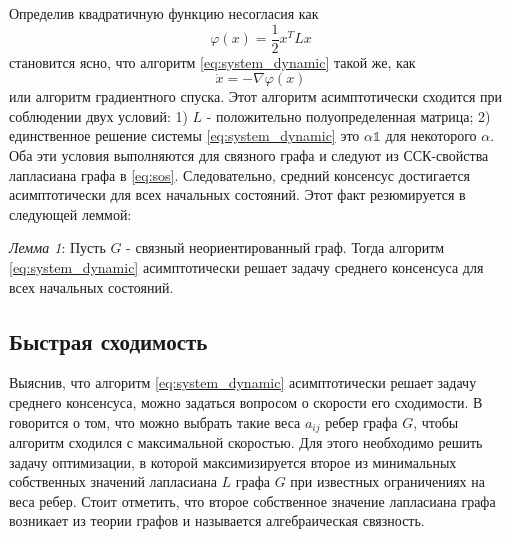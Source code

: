 \documentclass[a4paper,article,14pt]{extarticle}
\begin{document}
Определив квадратичную функцию несогласия как
\begin{equation}
\varphi(x) = \frac{1}{2}x^TLx
\end{equation}
становится ясно, что алгоритм \ref{eq:system_dynamic} такой же, как
\begin{equation}
\dot x = -\nabla \varphi(x)
\end{equation}
или алгоритм градиентного спуска. Этот алгоритм асимптотически сходится при соблюдении двух условий: 1) $L$ - положительно полуопределенная матрица; 2) единственное решение системы \ref{eq:system_dynamic} это $\alpha \mathds{1}$ для некоторого $\alpha$. Оба эти условия выполняются для связного графа и следуют из ССК-свойства лапласиана графа в \ref{eq:sos}. Следовательно, средний консенсус достигается асимптотически для всех начальных состояний. Этот факт резюмируется в \cite{consensus_basics} следующей леммой:

\textit{Лемма 1}: Пусть $G$ - связный неориентированный граф. Тогда алгоритм \ref{eq:system_dynamic} асимптотически решает задачу среднего консенсуса для всех начальных состояний.

\subsection{Быстрая сходимость}
Выяснив, что алгоритм \ref{eq:system_dynamic} асимптотически решает задачу среднего консенсуса, можно задаться вопросом о скорости его сходимости. В \cite{fast_averaging} говорится о том, что можно выбрать такие веса $a_{ij}$ ребер графа $G$, чтобы алгоритм сходился с максимальной скоростью. Для этого необходимо решить задачу оптимизации, в которой максимизируется второе из минимальных собственных значений лапласиана $L$ графа $G$ при известных ограничениях на веса ребер. Стоит отметить, что второе собственное значение лапласиана графа возникает из теории графов и называется алгебраическая связность.
\end{document}
